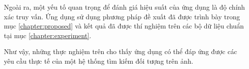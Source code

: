 	Ngoài ra, một yếu tố quan trọng để đánh giá hiệu suất của ứng dụng là độ chính xác truy vấn. Ứng dụng sử dụng phương pháp đề xuất đã được trình bày trong mục \ref{chapter:proposed} và kết quả đã được thí nghiệm trên các bộ dữ liệu chuẩn tại mục \ref{chapter:experiment}. 
	
	Như vậy, những thực nghiệm trên cho thấy ứng dụng có thể đáp ứng được các yêu cầu thực tế của một hệ thống tìm kiếm đối tượng trên ảnh.